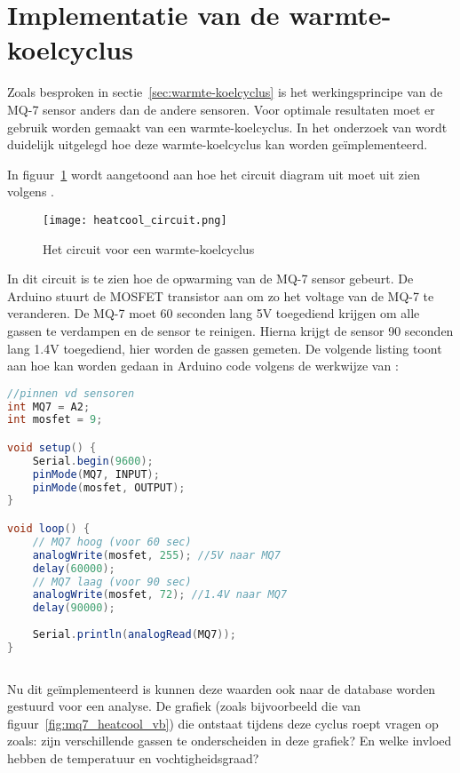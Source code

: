 \section{Implementatie van de warmte-koelcyclus}%
\label{sec:warmte_koel}


Zoals besproken in sectie~\ref{sec:warmte-koelcyclus} is het werkingsprincipe van de MQ-7 sensor anders dan de andere sensoren. Voor optimale resultaten moet er  gebruik worden gemaakt van een warmte-koelcyclus. In het onderzoek van \textcite{Kobbekaduwa2021} wordt duidelijk uitgelegd hoe deze warmte-koelcyclus kan worden geïmplementeerd. 

In figuur~\ref{fig:heatcool_circuit} wordt aangetoond aan hoe het circuit diagram uit moet uit zien volgens \textcite{Kobbekaduwa2021}.

\begin{figure}[h]
    \texttt{[image: heatcool\_circuit.png]}
    \caption[Circuit warmte-koelcyclus]{Het circuit voor een warmte-koelcyclus \autocite{Kobbekaduwa2021}}
    \label{fig:heatcool_circuit}
\end{figure}

In dit circuit is te zien hoe de opwarming van de MQ-7 sensor gebeurt. De Arduino stuurt de MOSFET transistor aan om zo het voltage van de MQ-7 te veranderen. De MQ-7 moet 60 seconden lang 5V toegediend krijgen om alle gassen te verdampen en de sensor te reinigen. Hierna krijgt de sensor 90 seconden lang 1.4V toegediend, hier worden de gassen gemeten. De volgende listing toont aan hoe kan worden gedaan in Arduino code volgens de werkwijze van \textcite{Kobbekaduwa2021}:

\begin{lstlisting}[language=Java,caption={Warmte-koelcyclus MQ-7}]
//pinnen vd sensoren 
int MQ7 = A2;
int mosfet = 9;

void setup() {
    Serial.begin(9600);
    pinMode(MQ7, INPUT);
    pinMode(mosfet, OUTPUT);
}

void loop() {
    // MQ7 hoog (voor 60 sec)
    analogWrite(mosfet, 255); //5V naar MQ7
    delay(60000);
    // MQ7 laag (voor 90 sec)
    analogWrite(mosfet, 72); //1.4V naar MQ7
    delay(90000);
    
    Serial.println(analogRead(MQ7));
}
        
\end{lstlisting}

Nu dit geïmplementeerd is kunnen deze waarden ook naar de database worden gestuurd voor een analyse. De grafiek (zoals bijvoorbeeld die van figuur~\ref{fig:mq7_heatcool_vb}) die ontstaat tijdens deze cyclus roept vragen op zoals: zijn verschillende gassen te onderscheiden in deze grafiek? En welke invloed hebben de temperatuur en vochtigheidsgraad?

